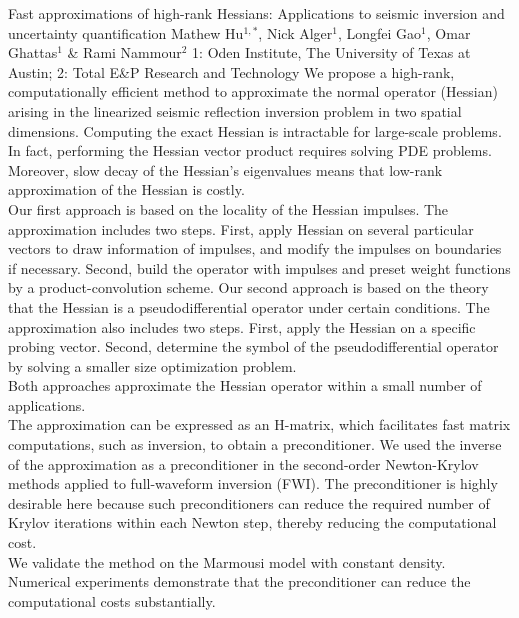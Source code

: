 \begin{addmargin}[2em]{0em}
\vspace{1.5ex}
\abs
{Fast approximations of high-rank Hessians: Applications to seismic inversion and uncertainty quantification}
{Mathew Hu$^{1,*}$, Nick Alger$^{1}$, Longfei Gao$^{1}$, Omar Ghattas$^{1}$ \& Rami Nammour$^{2}$}
{1: Oden Institute, The University of Texas at Austin; 2: Total E\&P Research and Technology}
{We propose a high-rank, computationally efficient method to approximate the normal operator (Hessian) arising in the linearized seismic reflection inversion problem in two spatial dimensions. Computing the exact Hessian is intractable for large-scale problems. In fact, performing the Hessian vector product requires solving PDE problems. Moreover, slow decay of the Hessian's eigenvalues means that low-rank approximation of the Hessian is costly.\\
Our first approach is based on the locality of the Hessian impulses. The approximation includes two steps. First, apply Hessian on several particular vectors to draw information of impulses, and modify the impulses on boundaries if necessary. Second, build the operator with impulses and preset weight functions by a product-convolution scheme. Our second approach is based on the theory that the Hessian is a pseudodifferential operator under certain conditions. The approximation also includes two steps. First, apply the Hessian on a specific probing vector. Second, determine the symbol of the pseudodifferential operator by solving a smaller size optimization problem.\\
Both approaches approximate the Hessian operator within a small number of applications.\\
The approximation can be expressed as an H-matrix, which facilitates fast matrix computations, such as inversion, to obtain a preconditioner. We used the inverse of the approximation as a preconditioner in the second-order Newton-Krylov methods applied to full-waveform inversion (FWI). The preconditioner is highly desirable here because such preconditioners can reduce the required number of Krylov iterations within each Newton step, thereby reducing the computational cost.\\
We validate the method on the Marmousi model with constant density. Numerical experiments demonstrate that the preconditioner can reduce the computational costs substantially.}


\end{addmargin}
